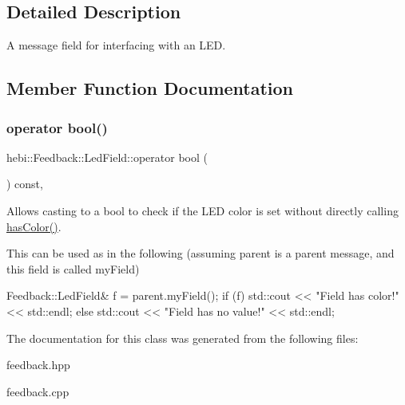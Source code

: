 \subsection{Detailed Description}
A message field for interfacing with an L\+ED. 

\subsection{Member Function Documentation}
\mbox{\label{classhebi_1_1Feedback_1_1LedField_ae258cf9c06ca97d9619ab5e108ce2298}} 
\subsubsection{\texorpdfstring{operator bool()}{operator bool()}}
{\footnotesize\ttfamily hebi\+::\+Feedback\+::\+Led\+Field\+::operator bool (\begin{DoxyParamCaption}{ }\end{DoxyParamCaption}) const\hspace{0.3cm}{\ttfamily [inline]}, {\ttfamily [explicit]}}



Allows casting to a bool to check if the L\+ED color is set without directly calling {\ttfamily \hyperlink{classhebi_1_1Feedback_1_1LedField_a6a224e138119ac5c9be96617cf8acffe}{has\+Color()}}. 

This can be used as in the following (assuming \textquotesingle{}parent\textquotesingle{} is a parent message, and this field is called \textquotesingle{}my\+Field\textquotesingle{}) 
\begin{DoxyCode}
Feedback::LedField& f = parent.myField();
\textcolor{keywordflow}{if} (f)
  std::cout << \textcolor{stringliteral}{"Field has color!"} << std::endl;
\textcolor{keywordflow}{else}
  std::cout << \textcolor{stringliteral}{"Field has no value!"} << std::endl;
\end{DoxyCode}
 

The documentation for this class was generated from the following files\+:\begin{DoxyCompactItemize}
\item 
feedback.\+hpp\item 
feedback.\+cpp\end{DoxyCompactItemize}

